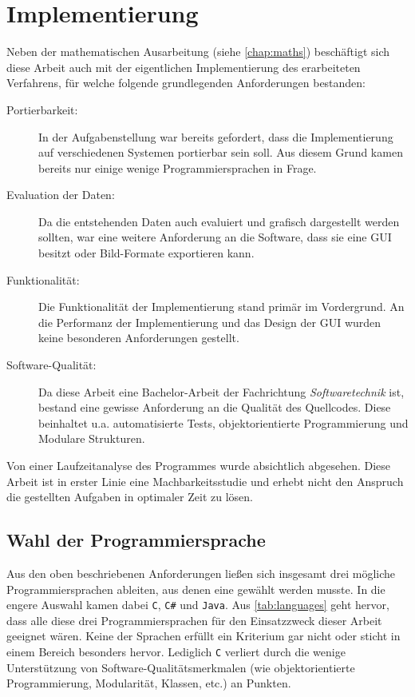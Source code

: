 \chapter{Implementierung}
\label{chap:impl}
Neben der mathematischen Ausarbeitung (siehe \autoref{chap:maths}) beschäftigt sich diese Arbeit auch mit der eigentlichen Implementierung des erarbeiteten Verfahrens, für welche folgende grundlegenden Anforderungen bestanden:

\begin{description}
\item[Portierbarkeit:] In der Aufgabenstellung war bereits gefordert, dass die Implementierung auf verschiedenen Systemen portierbar sein soll. Aus diesem Grund kamen bereits nur einige wenige Programmiersprachen in Frage.
\item[Evaluation der Daten:] Da die entstehenden Daten auch evaluiert und grafisch dargestellt werden sollten, war eine weitere Anforderung an die Software, dass sie eine \gls{GUI} besitzt oder Bild-Formate exportieren kann.
\item[Funktionalität:] Die Funktionalität der Implementierung stand primär im Vordergrund. An die Performanz der Implementierung und das Design der \gls{GUI} wurden keine besonderen Anforderungen gestellt.
\item[Software-Qualität:] Da diese Arbeit eine Bachelor-Arbeit der Fachrichtung \textit{Softwaretechnik} ist, bestand eine gewisse Anforderung an die Qualität des Quellcodes. Diese beinhaltet u.a. automatisierte Tests, objektorientierte Programmierung und Modulare Strukturen.
\end{description}

Von einer Laufzeitanalyse des Programmes wurde absichtlich abgesehen. Diese Arbeit ist in erster Linie eine Machbarkeitsstudie und erhebt nicht den Anspruch die gestellten Aufgaben in optimaler Zeit zu lösen.

\section{Wahl der Programmiersprache}
\label{sec:language}
Aus den oben beschriebenen Anforderungen ließen sich insgesamt drei mögliche Programmiersprachen ableiten, aus denen eine gewählt werden musste. In die engere Auswahl kamen dabei \texttt{C}, \texttt{C\#} und \texttt{Java}. Aus \autoref{tab:languages} geht hervor, dass alle diese drei Programmiersprachen für den Einsatzzweck dieser Arbeit geeignet wären. Keine der Sprachen erfüllt ein Kriterium gar nicht oder sticht in einem Bereich besonders hervor. Lediglich \texttt{C} verliert durch die wenige Unterstützung von Software-Qualitätsmerkmalen (wie objektorientierte Programmierung, Modularität, Klassen, etc.) an Punkten.

